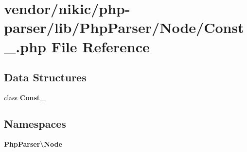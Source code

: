 \section{vendor/nikic/php-\/parser/lib/\+Php\+Parser/\+Node/\+Const\+\_\+.php File Reference}
\label{_const___8php}
\subsection*{Data Structures}
\begin{DoxyCompactItemize}
\item 
class {\bf Const\+\_\+}
\end{DoxyCompactItemize}
\subsection*{Namespaces}
\begin{DoxyCompactItemize}
\item 
 {\bf Php\+Parser\textbackslash{}\+Node}
\end{DoxyCompactItemize}
